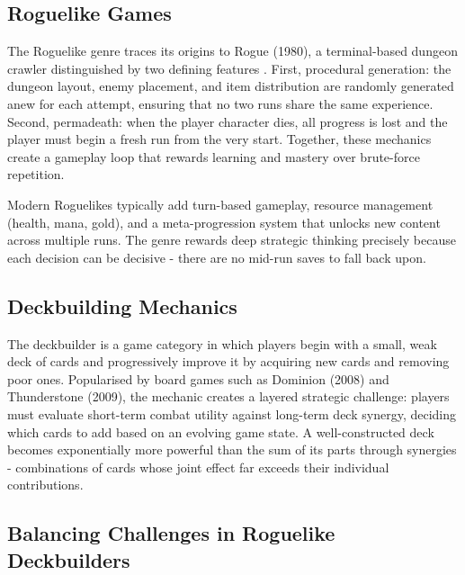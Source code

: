 \subsection{Roguelike Games}

The Roguelike genre traces its origins to Rogue (1980), a terminal-based dungeon crawler distinguished by two defining features \cite{dormans2011level}. First, procedural generation: the dungeon layout, enemy placement, and item distribution are randomly generated anew for each attempt, ensuring that no two runs share the same experience. Second, permadeath: when the player character dies, all progress is lost and the player must begin a fresh run from the very start. Together, these mechanics create a gameplay loop that rewards learning and mastery over brute-force repetition.

Modern Roguelikes typically add turn-based gameplay, resource management (health, mana, gold), and a meta-progression system that unlocks new content across multiple runs. The genre rewards deep strategic thinking precisely because each decision can be decisive - there are no mid-run saves to fall back upon.

\subsection{Deckbuilding Mechanics}

The deckbuilder is a game category in which players begin with a small, weak deck of cards and progressively improve it by acquiring new cards and removing poor ones. Popularised by board games such as Dominion (2008) and Thunderstone (2009), the mechanic creates a layered strategic challenge: players must evaluate short-term combat utility against long-term deck synergy, deciding which cards to add based on an evolving game state. A well-constructed deck becomes exponentially more powerful than the sum of its parts through synergies - combinations of cards whose joint effect far exceeds their individual contributions.

\subsection{Balancing Challenges in Roguelike Deckbuilders}

